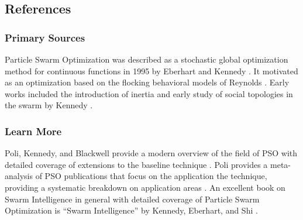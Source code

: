 

\subsection{References}

% 
% 
\subsubsection{Primary Sources}
Particle Swarm Optimization was described as a stochastic global optimization method for continuous functions in 1995 by Eberhart and Kennedy \cite{Eberhart1995, Kennedy1995}. It motivated as an optimization based on the flocking behavioral models of Reynolds \cite{Reynolds1987}.
Early works included the introduction of inertia \cite{Shi1998} and early study of social topologies in the swarm by Kennedy \cite{Kennedy1999}. 

% 
% 
\subsubsection{Learn More}
Poli, Kennedy, and Blackwell provide a modern overview of the field of PSO with detailed coverage of extensions to the baseline technique \cite{Poli2007}. Poli provides a meta-analysis of PSO publications that focus on the application the technique, providing a systematic breakdown on application areas \cite{Poli2008a}. 
An excellent book on Swarm Intelligence in general with detailed coverage of Particle Swarm Optimization is ``Swarm Intelligence'' by Kennedy, Eberhart, and Shi \cite{Kennedy2001}.



